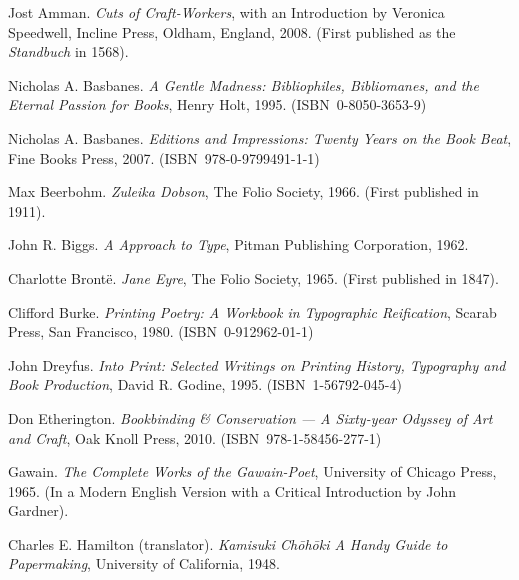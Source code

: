 \documentclass{memoir}
\newcommand*{\isbn}{{\small\textsc{ISBN}}}
\begin{document}

\begin{thebibliography}{RCHM99}

  Jost Amman.
\newblock \emph{Cuts of Craft-Workers},
          with an Introduction by Veronica Speedwell,
\newblock Incline Press, Oldham, England, 2008.
\newblock (First published as the \emph{Standbuch} in 1568).

  Nicholas A. Basbanes.
\newblock \emph{A Gentle Madness: Bibliophiles, Bibliomanes, and the Eternal
                Passion for Books},
\newblock Henry Holt, 1995. (\isbn\ 0-8050-3653-9)

  Nicholas A. Basbanes.
\newblock \emph{Editions and Impressions: Twenty Years on the Book Beat},
\newblock Fine Books Press, 2007. (\isbn\ 978-0-9799491-1-1)

  Max Beerbohm.
\newblock \emph{Zuleika Dobson},
\newblock The Folio Society, 1966.
\newblock (First published in 1911).

  John R. Biggs.
\newblock \emph{A Approach to Type},
\newblock Pitman Publishing Corporation, 1962.


  Charlotte Bront\"{e}.
\newblock \emph{Jane Eyre},
\newblock The Folio Society, 1965.
\newblock (First published in 1847).

  Clifford Burke.
\newblock \emph{Printing Poetry: A Workbook in Typographic Reification},
\newblock Scarab Press, San Francisco, 1980. (\isbn\ 0-912962-01-1)

  John Dreyfus.
\newblock \emph{Into Print: Selected Writings on Printing History, Typography
                and Book Production},
\newblock David R. Godine, 1995. (\isbn\ 1-56792-045-4)

  Don Etherington.
\newblock \emph{Bookbinding \& Conservation --- A Sixty-year Odyssey
                of Art and Craft},
\newblock Oak Knoll Press, 2010. (\isbn\ 978-1-58456-277-1)

  Gawain.
\newblock \emph{The Complete Works of the Gawain-Poet},
\newblock University of Chicago Press, 1965.
\newblock(In a Modern English Version with a Critical Introduction
          by John Gardner).

  Charles E. Hamilton (translator).
\newblock \emph{Kamisuki Ch\={o}h\={o}ki A Handy Guide to Papermaking},
\newblock University of California, 1948.


\end{thebibliography}
\end{document}
